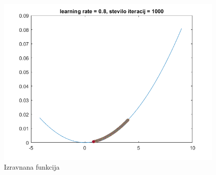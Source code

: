 \documentclass{article}
\begin{document}
\begin{figure}[h]
\includegraphics[scale=0.6]{izravnana_fun}   
 \caption{Izravnana funkcija}
\label{fig:foobar}
\end{figure}
\end{document}
